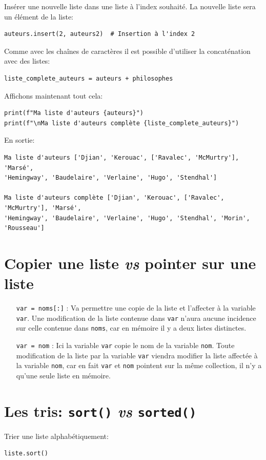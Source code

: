 \documentclass[a4paper,12pt]{book}
\begin{document}
Insérer une nouvelle liste dans une liste à l'index souhaité. La nouvelle liste sera un élément de la liste:
\begin{lstlisting}
auteurs.insert(2, auteurs2)  # Insertion à l'index 2
\end{lstlisting}

Comme avec les chaînes de caractères il est possible d'utiliser la concaténation avec des listes:
\begin{lstlisting}
liste_complete_auteurs = auteurs + philosophes 
\end{lstlisting}
\medskip

Affichons maintenant tout cela:
\begin{lstlisting}
print(f"Ma liste d'auteurs {auteurs}")
print(f"\nMa liste d'auteurs complète {liste_complete_auteurs}")
\end{lstlisting}
\medskip

En sortie:
\begin{verbatim}
Ma liste d'auteurs ['Djian', 'Kerouac', ['Ravalec', 'McMurtry'], 'Marsé', 
'Hemingway', 'Baudelaire', 'Verlaine', 'Hugo', 'Stendhal']

Ma liste d'auteurs complète ['Djian', 'Kerouac', ['Ravalec', 'McMurtry'], 'Marsé', 
'Hemingway', 'Baudelaire', 'Verlaine', 'Hugo', 'Stendhal', 'Morin', 'Rousseau']
\end{verbatim}
\medskip

\section{Copier une liste \textit{vs} pointer sur une liste}
\begin{itemize}
	\item[\texttt{var = noms[:]}]: Va permettre une copie de la liste et l'affecter à la variable \texttt{var}. Une modification de la liste contenue dans \texttt{var} n'aura aucune incidence sur celle contenue dans \texttt{noms}, car en mémoire il y a deux listes distinctes.
	\item[\texttt{var = nom}]: Ici la variable \texttt{var} copie le nom de la variable \texttt{nom}. Toute modification de la liste par la variable \texttt{var} viendra modifier la liste affectée à la variable \texttt{nom}, car en fait \texttt{var} et \texttt{nom} pointent sur la même collection, il n'y a qu'une seule liste en mémoire.
\end{itemize}
\medskip

\section{Les tris: \texttt{sort()} \textit{vs} \texttt{sorted()}}
Trier une liste alphabétiquement:
\begin{lstlisting}
liste.sort()
\end{lstlisting}
\medskip
\end{document}
